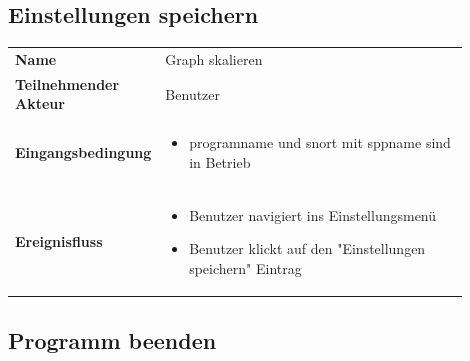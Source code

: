 \subsection{Einstellungen speichern}

\begin{tabular}{lp{0.9\linewidth}}
\textbf{Name} & Graph skalieren \\

\textbf{Teilnehmender Akteur} & Benutzer \\

\textbf{Eingangsbedingung} &
				\begin{minipage}[t]{\linewidth}
				\begin{itemize}[nosep,after=\strut,leftmargin=10pt]

				\item \gls{programname} und \gls{snort} mit \gls{sppname} sind in Betrieb

				\end{itemize}
				\end{minipage} \\
\textbf{Ereignisfluss} &
				\begin{minipage}[t]{\linewidth}
				\begin{itemize}[nosep,after=\strut,leftmargin=10pt]
				\item Benutzer navigiert ins Einstellungsmenü
				\item Benutzer klickt auf den "Einstellungen speichern" Eintrag
				\end{itemize}
				\end{minipage} \\
\end{tabular}

\subsection{Programm beenden}

